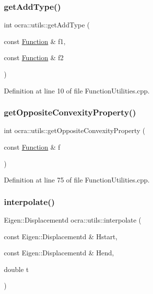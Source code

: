 \subsubsection{\texorpdfstring{get\+Add\+Type()}{getAddType()}}
{\footnotesize\ttfamily int ocra\+::utils\+::get\+Add\+Type (\begin{DoxyParamCaption}\item[{const \hyperlink{classocra_1_1Function}{Function} \&}]{f1,  }\item[{const \hyperlink{classocra_1_1Function}{Function} \&}]{f2 }\end{DoxyParamCaption})}



Definition at line 10 of file Function\+Utilities.\+cpp.

\hypertarget{namespaceocra_1_1utils_a7a11f7cb798c473b72d7677b83ed859e}{}\label{namespaceocra_1_1utils_a7a11f7cb798c473b72d7677b83ed859e} 
\subsubsection{\texorpdfstring{get\+Opposite\+Convexity\+Property()}{getOppositeConvexityProperty()}}
{\footnotesize\ttfamily int ocra\+::utils\+::get\+Opposite\+Convexity\+Property (\begin{DoxyParamCaption}\item[{const \hyperlink{classocra_1_1Function}{Function} \&}]{f }\end{DoxyParamCaption})}



Definition at line 75 of file Function\+Utilities.\+cpp.

\hypertarget{namespaceocra_1_1utils_a8d939e7ed429dffde760d84e41258940}{}\label{namespaceocra_1_1utils_a8d939e7ed429dffde760d84e41258940} 
\subsubsection{\texorpdfstring{interpolate()}{interpolate()}}
{\footnotesize\ttfamily Eigen\+::\+Displacementd ocra\+::utils\+::interpolate (\begin{DoxyParamCaption}\item[{const Eigen\+::\+Displacementd \&}]{Hstart,  }\item[{const Eigen\+::\+Displacementd \&}]{Hend,  }\item[{double}]{t }\end{DoxyParamCaption})}

